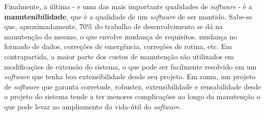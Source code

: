 \documentclass[12pt, a4paper]{article}
\begin{document}
    Finalmente, a última - e uma das mais importante qualidades de \textit{software} - é a \textbf{manutenibilidade}, que é a qualidade de um \textit{software} de ser mantido. Sabe-se que, aproximadamente, 70\% do trabalho de desenvolvimento se dá na manutenção do mesmo, o que envolve mudança de requisitos, mudança no formado de dados, correções de emergência, correções de rotina, etc. Em contrapartida, a maior parte dos custos de manutenção são utilizados em modificações de extensão do sistema, o que pode ser facilmente resolvido em um \textit{software} que tenha boa extensibilidade desde seu projeto. Em suma, um projeto de \textit{software} que garanta corretude, robustez, extensibilidade e reusabilidade desde o projeto do sistema tende a ter menores complicações ao longo da manutenção o que pode levar ao ampliamento da vida-útil do \textit{software}.
\end{document}
